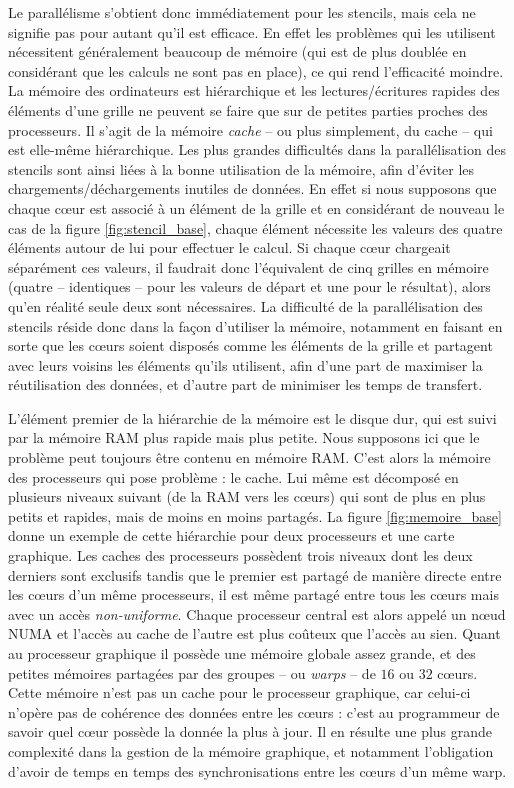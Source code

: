 Le parallélisme s'obtient donc immédiatement pour les stencils, mais cela ne signifie pas pour autant qu'il est efficace. En effet les problèmes qui les utilisent nécessitent généralement beaucoup de mémoire (qui est de plus doublée en considérant que les calculs ne sont pas en place), ce qui rend l'efficacité moindre. La mémoire des ordinateurs est hiérarchique et les lectures/écritures rapides des éléments d'une grille ne peuvent se faire que sur de petites parties proches des processeurs. Il s'agit de la mémoire \emph{cache} -- ou plus simplement, du cache -- qui est elle-même hiérarchique. Les plus grandes difficultés dans la parallélisation des stencils sont ainsi liées à la bonne utilisation de la mémoire, afin d'éviter les chargements/déchargements inutiles de données. En effet si nous supposons que chaque cœur est associé à un élément de la grille et en considérant de nouveau le cas de la figure \ref{fig:stencil_base}, chaque élément nécessite les valeurs des quatre éléments autour de lui pour effectuer le calcul. Si chaque cœur chargeait séparément ces valeurs, il faudrait donc l'équivalent de cinq grilles en mémoire (quatre -- identiques -- pour les valeurs de départ et une pour le résultat), alors qu'en réalité seule deux sont nécessaires. La difficulté de la parallélisation des stencils réside donc dans la façon d'utiliser la mémoire, notamment en faisant en sorte que les cœurs soient disposés comme les éléments de la grille et partagent avec leurs voisins les éléments qu'ils utilisent, afin d'une part de maximiser la réutilisation des données, et d'autre part de minimiser les temps de transfert.

L'élément premier de la hiérarchie de la mémoire est le disque dur, qui est suivi par la mémoire RAM plus rapide mais plus petite. Nous supposons ici que le problème peut toujours être contenu en mémoire RAM. C'est alors la mémoire des processeurs qui pose problème : le cache. Lui même est décomposé en plusieurs niveaux suivant (de la RAM vers les cœurs) qui sont de plus en plus petits et rapides, mais de moins en moins partagés. La figure \ref{fig:memoire_base} donne un exemple de cette hiérarchie pour deux processeurs et une carte graphique. Les caches des processeurs possèdent trois niveaux dont les deux derniers sont exclusifs tandis que le premier est partagé de manière directe entre les cœurs d'un même processeurs, il est même partagé entre tous les cœurs mais avec un accès \emph{non-uniforme}. Chaque processeur central est alors appelé un nœud NUMA et l'accès au cache de l'autre est plus coûteux que l'accès au sien. Quant au processeur graphique il possède une mémoire globale assez grande, et des petites mémoires partagées par des groupes -- ou \emph{warps} -- de $16$ ou $32$ cœurs. Cette mémoire n'est pas un cache pour le processeur graphique, car celui-ci n'opère pas de cohérence des données entre les cœurs : c'est au programmeur de savoir quel cœur possède la donnée la plus à jour. Il en résulte une plus grande complexité dans la gestion de la mémoire graphique, et notamment l'obligation d'avoir de temps en temps des synchronisations entre les cœurs d'un même warp. 


